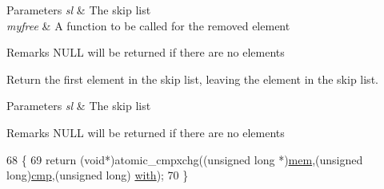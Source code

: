 \begin{DoxyParams}{Parameters}
{\em sl} & The skip list \\
\hline
{\em myfree} & A function to be called for the removed element \\
\hline
\end{DoxyParams}
\begin{DoxyRemark}{Remarks}
N\+U\+LL will be returned if there are no elements
\end{DoxyRemark}
Return the first element in the skip list, leaving the element in the skip list. 
\begin{DoxyParams}{Parameters}
{\em sl} & The skip list \\
\hline
\end{DoxyParams}
\begin{DoxyRemark}{Remarks}
N\+U\+LL will be returned if there are no elements 
\end{DoxyRemark}

\begin{DoxyCode}
68 \{
69     \textcolor{keywordflow}{return} (\textcolor{keywordtype}{void}*)atomic\_cmpxchg((\textcolor{keywordtype}{unsigned} \textcolor{keywordtype}{long} *)\hyperlink{group__MOD__DAV_gac8d0feaae3f1c6b0eac72aaa9af557c1}{mem},(\textcolor{keywordtype}{unsigned} \textcolor{keywordtype}{long})\hyperlink{group__apr__atomic_ga337f72af8c74a9110f79160df3bba5e8}{cmp},(\textcolor{keywordtype}{unsigned} \textcolor{keywordtype}{long})
      \hyperlink{group__apr__atomic_ga62bdcea60b77e638d3d88947a34aff05}{with});
70 \}
\end{DoxyCode}
